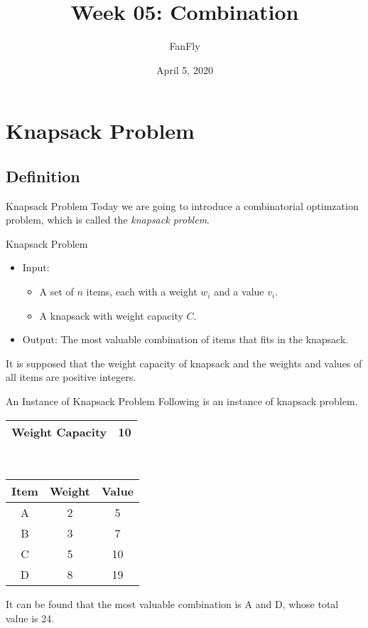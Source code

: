 \documentclass{beamer}
\title{Week 05: Combination}
\author{FanFly}
\date{April 5, 2020}
\begin{document}
\begin{frame}
  \titlepage
\end{frame}

\section{Knapsack Problem}
\subsection{Definition}
\begin{frame}{Knapsack Problem}
  Today we are going to introduce a combinatorial optimzation problem, which is
  called the \emph{knapsack problem}. \pause
  \begin{block}{Knapsack Problem}
    \begin{itemize}
      \item Input:
      \begin{itemize}
        \item A set of $n$ items, each with a weight $w_i$ and a value
        $v_i$.
        \item A knapsack with weight capacity $C$. \pause
      \end{itemize}
      \item Output: The most valuable combination of items that fits in the
      knapsack.
    \end{itemize}
    \pause
  \end{block}
  It is supposed that the weight capacity of knapsack and the weights and
  values of all items are positive integers.
\end{frame}

\begin{frame}{An Instance of Knapsack Problem}
  Following is an instance of knapsack problem. \pause
  \begin{center}
    \def\arraystretch{1.25}
    \begin{tabular}{|c|c|}
      \hline
      Weight Capacity & 10 \\
      \hline
    \end{tabular} \\[.5em]
    \begin{tabular}{|c|cc|}
      \hline
      Item & Weight & Value \\
      \hline
      A & 2 & 5 \\
      B & 3 & 7 \\
      C & 5 & 10 \\
      D & 8 & 19 \\
      \hline
    \end{tabular}
    \pause
  \end{center}
  It can be found that the most valuable combination is A and D, whose total
  value is 24.
\end{frame}
\end{document}
